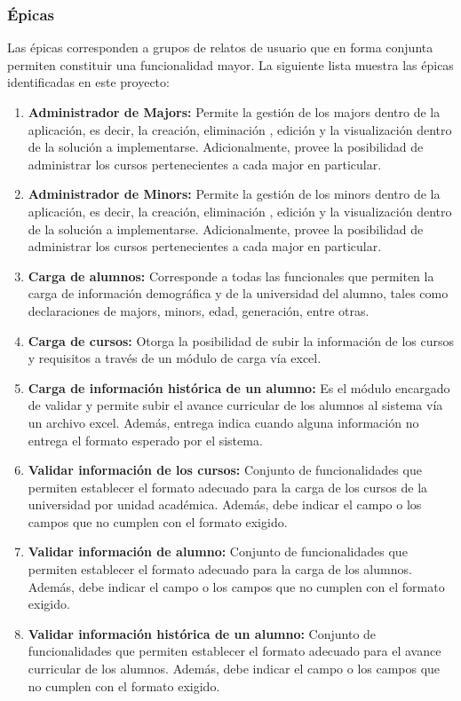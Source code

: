 \subsubsection{Épicas \label{sec:epics}}

Las épicas corresponden a grupos de relatos de usuario que en forma conjunta permiten constituir una funcionalidad mayor. La siguiente lista muestra las épicas identificadas en este proyecto:

\begin{enumerate}
	\item \textbf{Administrador de Majors:} Permite la gestión de los majors dentro de la aplicación, es decir, la creación, eliminación , edición y la visualización dentro de la solución a implementarse. Adicionalmente, provee la posibilidad de administrar los cursos pertenecientes a cada major en particular.
	\item \textbf{Administrador de Minors:} Permite la gestión de los minors dentro de la aplicación, es decir, la creación, eliminación , edición y la visualización dentro de la solución a implementarse. Adicionalmente, provee la posibilidad de administrar los cursos pertenecientes a cada major en particular.
	\item \textbf{Carga de alumnos:} Corresponde a todas las funcionales que permiten la carga de información demográfica y de la universidad del alumno, tales como declaraciones de majors, minors, edad, generación, entre otras.
	\item \textbf{Carga de cursos:} Otorga la posibilidad de subir la información de los cursos y requisitos a través de un módulo de carga vía excel.
	\item \textbf{Carga de información histórica de un alumno:} Es el módulo encargado de validar y permite subir el avance curricular de los alumnos al sistema vía un archivo excel. Además, entrega indica cuando alguna información no entrega el formato esperado por el sistema.
	\item \textbf{Validar información de los cursos:} Conjunto de funcionalidades que permiten establecer el formato adecuado para la carga de los cursos de la universidad por unidad académica. Además, debe indicar el campo o los campos que no cumplen con el formato exigido.
	\item \textbf{Validar información de alumno:} Conjunto de funcionalidades que permiten establecer el formato adecuado para la carga de los alumnos. Además, debe indicar el campo o los campos que no cumplen con el formato exigido.
	\item \textbf{Validar información histórica de un alumno:} Conjunto de funcionalidades que permiten establecer el formato adecuado para el avance curricular de los alumnos. Además, debe indicar el campo o los campos que no cumplen con el formato exigido.

\end{enumerate}
